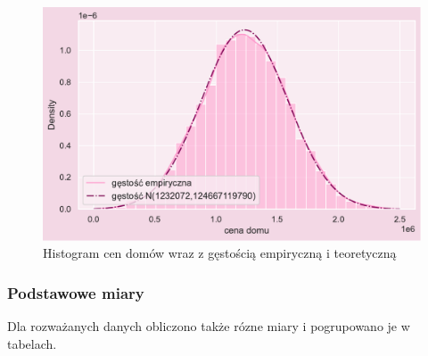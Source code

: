 \documentclass{article}
\begin{document}
\begin{figure}[H]
	\begin{center}
		\includegraphics[scale=0.68]{images/price_hist_teor.pdf}
		\caption{Histogram cen domów wraz z gęstością empiryczną i teoretyczną}
		\label{denistyx}
	\end{center}
	\end{figure}
 

\subsubsection{Podstawowe miary}
Dla rozważanych danych obliczono także rózne miary i pogrupowano je w tabelach. 
\end{document}
